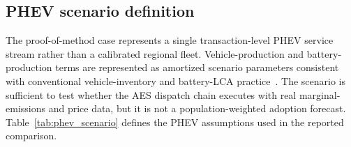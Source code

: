 \documentclass[cleantechnol,article,submit,pdftex,moreauthors]{Definitions/mdpi}
\begin{document}
\subsection{PHEV scenario definition}
\label{subsec:phev_scenario}

The proof-of-method case represents a single transaction-level PHEV service stream rather than a calibrated regional fleet. Vehicle-production and battery-production terms are represented as amortized scenario parameters consistent with conventional vehicle-inventory and battery-LCA practice~\cite{Wernet2016,Ellingsen2014}. The scenario is sufficient to test whether the AES dispatch chain executes with real marginal-emissions and price data, but it is not a population-weighted adoption forecast. Table~\ref{tab:phev_scenario} defines the PHEV assumptions used in the reported comparison.
\end{document}
